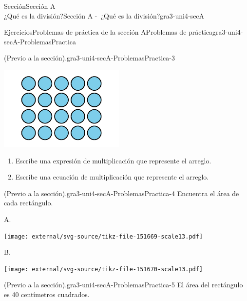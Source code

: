 \begin{sectionptx}{Sección}{{\Large Sección A\\}¿Qué es la división?}{}{Sección A -~¿Qué es la división?}{}{}{gra3-uni4-secA}
\begin{exercises-subsection}{Ejercicios}{Problemas de práctica de la sección A}{}{Problemas de práctica}{}{}{gra3-uni4-secA-ProblemasPractica}
\begin{divisionexercise}{1}{(Previo a la sección).}{}{gra3-uni4-secA-ProblemasPractica-3}
\begin{sidebyside}{2}{0}{0}{0}
\begin{sbspanel}{0.3}
\includegraphics[max width=\linewidth, center]{external/svg-source/tikz-file-151668.pdf}
\end{sbspanel}%
\begin{sbspanel}{0.7}%
%
\begin{enumerate}[label={(\alph*)}]
\item{}Escribe una expresión de multiplicación que represente el arreglo.%
\item{}Escribe una ecuación de multiplicación que represente el arreglo.%
\end{enumerate}
%
\end{sbspanel}%
\end{sidebyside}%
\end{divisionexercise}%
\begin{divisionexercise}{2}{(Previo a la sección).}{}{gra3-uni4-secA-ProblemasPractica-4}%
Encuentra el área de cada rectángulo.%
\begin{sidebyside}{2}{0.05}{0.05}{0.1}%
\begin{sbspanel}{0.3}%
A.%
\par
\texttt{[image: external/svg-source/tikz-file-151669-scale13.pdf]}
\end{sbspanel}%
\begin{sbspanel}{0.5}%
B.%
\par
\texttt{[image: external/svg-source/tikz-file-151670-scale13.pdf]}
\end{sbspanel}%
\end{sidebyside}%
\end{divisionexercise}%
\begin{divisionexercise}{3}{(Previo a la sección).}{}{gra3-uni4-secA-ProblemasPractica-5}%
El área del rectángulo es 40 centímetros cuadrados.%

\end{divisionexercise}
\end{exercises-subsection}
\end{sectionptx}
